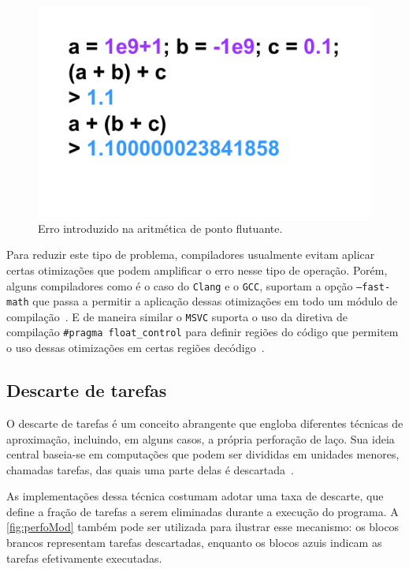 \begin{figure}[htb]
    \caption{Erro introduzido na aritmética de ponto flutuante.}
    \label{fig:floatPoint}
    \includegraphics[scale=0.7]{figuras/fastmath.pdf}
    \fonte{}
\end{figure}

Para reduzir este tipo de problema, compiladores usualmente evitam aplicar certas otimizações que podem amplificar o erro nesse tipo de operação. Porém, alguns compiladores como é o caso do \texttt{Clang} e o \texttt{GCC}, suportam a opção \texttt{--fast-math} que passa a permitir a aplicação dessas otimizações em todo um módulo de compilação~\cite{gccffast, clangffast}. E de maneira similar o \texttt{MSVC} suporta o uso da diretiva de compilação \texttt{\#pragma float\_control} para definir regiões do código que permitem o uso dessas otimizações em certas regiões decódigo~\cite{msvcfast}.

\subsection{Descarte de tarefas}\label{subsec:descTar}

O descarte de tarefas é um conceito abrangente que engloba diferentes técnicas de aproximação, incluindo, em alguns casos, a própria perforação de laço. Sua ideia central baseia-se em computações que podem ser divididas em unidades menores, chamadas tarefas, das quais uma parte delas é descartada~\cite{mittal2016}.

As implementações dessa técnica costumam adotar uma taxa de descarte, que define a fração de tarefas a serem eliminadas durante a execução do programa. A \autoref{fig:perfoMod} também pode ser utilizada para ilustrar esse mecanismo: os blocos brancos representam tarefas descartadas, enquanto os blocos azuis indicam as tarefas efetivamente executadas.

